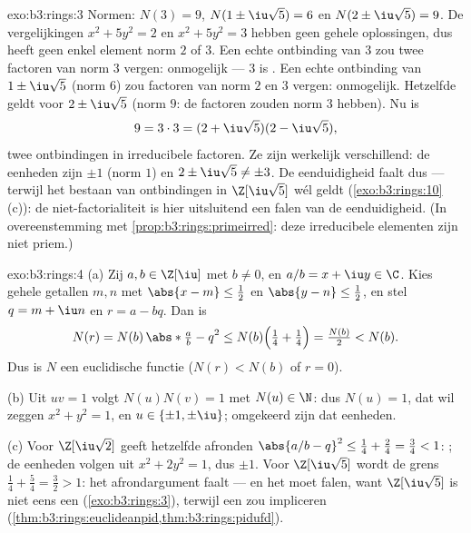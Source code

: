\begin{solution}{exo:b3:rings:3}
Normen: $N(3) = 9$, $N(1 \pm \iu\sqrt5) = 6$ en $N(2 \pm
\iu\sqrt5) = 9$. De vergelijkingen $x^2 + 5y^2 = 2$ en $x^2 + 5y^2
= 3$ hebben geen gehele oplossingen, dus heeft geen enkel element
norm $2$ of $3$. Een echte ontbinding van $3$ zou twee factoren van
norm $3$ vergen: onmogelijk --- $3$ is . Een echte
ontbinding van $1 \pm \iu\sqrt5$ (norm $6$) zou factoren van norm
$2$ en $3$ vergen: onmogelijk. Hetzelfde geldt voor $2 \pm
\iu\sqrt5$ (norm $9$: de factoren zouden norm $3$ hebben). Nu is
\[
9 = 3 \cdot 3 = (2 + \iu\sqrt5)(2 - \iu\sqrt5),
\]
twee ontbindingen in irreducibele factoren. Ze zijn werkelijk
verschillend: de eenheden zijn $\pm 1$ (norm $1$) en $2 \pm
\iu\sqrt5 \neq \pm 3$. De eenduidigheid faalt dus --- terwijl het
bestaan van ontbindingen in $\Z[\iu\sqrt5]$ wél geldt
(\cref{exo:b3:rings:10}(c)): de niet-factorialiteit is hier
uitsluitend een falen van de eenduidigheid. (In overeenstemming
met \cref{prop:b3:rings:primeirred}: deze irreducibele elementen
zijn niet priem.)
\end{solution}

\begin{solution}{exo:b3:rings:4}
(a) Zij $a, b \in \Z[\iu]$ met $b \neq 0$, en $a/b = x + \iu y \in
\C$. Kies gehele getallen $m, n$ met $\abs{x - m} \leq \frac12$ en
$\abs{y - n} \leq \frac12$, en stel $q = m + \iu n$ en $r = a -
bq$. Dan is
\[
N(r) = N(b)\,\abs*{\tfrac ab - q}^2
\leq N(b)\Bigl(\tfrac14 + \tfrac14\Bigr) = \tfrac{N(b)}2 < N(b).
\]
Dus is $N$ een euclidische functie ($N(r) < N(b)$ of $r = 0$).

(b) Uit $uv = 1$ volgt $N(u)N(v) = 1$ met $N(u) \in \N$: dus $N(u)
= 1$, dat wil zeggen $x^2 + y^2 = 1$, en $u \in \{\pm 1,
\pm\iu\}$; omgekeerd zijn dat eenheden.

(c) Voor $\Z[\iu\sqrt2]$ geeft hetzelfde afronden $\abs{a/b - q}^2
\leq \frac14 + \frac{2}4 = \frac34 < 1$: ; de eenheden
volgen uit $x^2 + 2y^2 = 1$, dus $\pm 1$. Voor $\Z[\iu\sqrt5]$
wordt de grens $\frac14 + \frac54 = \frac32 > 1$: het
afrondargument faalt --- en het moet falen, want $\Z[\iu\sqrt5]$
is niet eens een  (\cref{exo:b3:rings:3}), terwijl 
een  zou impliceren
(\cref{thm:b3:rings:euclideanpid,thm:b3:rings:pidufd}).
\end{solution}

